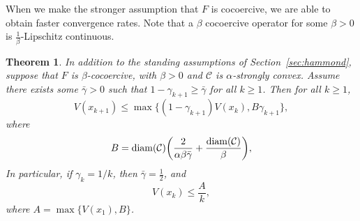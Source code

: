 \documentclass[pdflatex,sn-mathphys-num]{sn-jnl}%
\newcommand\diam{\mathop{\rm diam}}
\newcommand\C{\mathcal{C}}
\theoremstyle{thmstyleone}%
\newtheorem{theorem}{Theorem}%
\theoremstyle{thmstyletwo}%
\theoremstyle{thmstylethree}%
\begin{document}
When we make the stronger assumption that $F$ is cocoercive, we are able to obtain faster convergence rates.
Note that a $\beta$ cocoercive operator for some $\beta > 0$ is $\frac{1}{\beta}$-Lipschitz continuous.
\begin{theorem}
  In addition to the standing assumptions of Section~\ref{sec:hammond}, suppose that $F$ is $\beta$-cocoercive, with $\beta > 0$ and $\C$ is $\alpha$-strongly convex.
  Assume there exists some $\bar{\gamma} > 0$ such that $1-\gamma_{k+1} \geq \bar{\gamma}$ for all $k \geq 1$.
  Then for all $k \geq 1$,
  \[
    V(x_{k+1}) \leq \max\big\{(1-\gamma_{k+1})V(x_k), B\gamma_{k+1}\big\},
  \]
  where
  \[
    B = \diam(\C)\bigg(\frac{2}{\alpha\beta\bar{\gamma}} + \frac{\diam(\C)}{\beta}\bigg),
  \]
  In particular, if $\gamma_k = 1/k$, then $\bar{\gamma} = \frac{1}{2}$, and
  \[
    V(x_k) \leq \frac{A}{k},
  \]
  where $A = \max\{V(x_1), B\}$.
\end{theorem}
\end{document}
